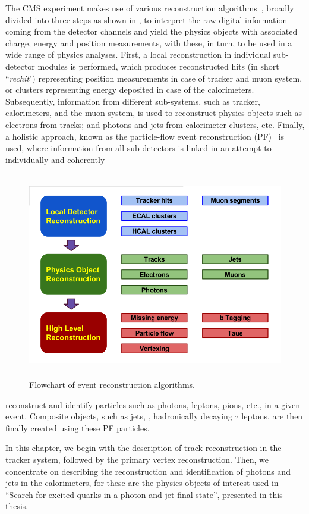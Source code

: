 The CMS experiment makes use of various reconstruction algorithms~\cite{Lange:2011zza}, broadly divided into three steps as shown in 
\fig{\ref{fig:EvntRecons_BlockDiag}},  to interpret the raw digital information coming from the detector channels and yield the physics objects 
with associated charge, energy and position measurements, with these, in turn, to be used in a wide range of physics analyses. First, a local 
reconstruction in individual sub-detector modules is performed, which produces reconstructed hits (in short ``\emph{rechit}") representing position 
measurements in case of tracker and muon system, or clusters representing energy deposited in case of the calorimeters. Subsequently, information from 
different sub-systems, such as tracker, calorimeters, and the muon system, is used to reconstruct physics objects such as electrons from tracks; and 
photons and jets from calorimeter clusters, etc. Finally, a holistic approach, known as the particle-flow event reconstruction 
(PF)~\cite{CMS-PAS-PFT-09-001,CMS-PAS-PFT-10-001} is used, where information from all sub-detectors is linked in an attempt to individually and coherently
\begin{figure}[h]
\centering
\includegraphics[width=13cm,height=9cm]{ch4/figures/EventReconstruction_BlockDiag.png}
\caption{Flowchart of event reconstruction algorithms.}
\label{fig:EvntRecons_BlockDiag}
\end{figure}
reconstruct and identify particles such as photons, leptons, pions, etc., in a given event. Composite objects, such as jets, \met, hadronically 
decaying $\tau$ leptons, are then finally created using these PF particles. 

In this chapter, we begin with the description of track reconstruction in the tracker system, followed by the primary vertex reconstruction. 
Then, we concentrate on describing the reconstruction and identification of photons and jets in the calorimeters, for these are the physics objects 
of interest used in ``Search for excited quarks in a photon and jet final state'', presented in this thesis. 

